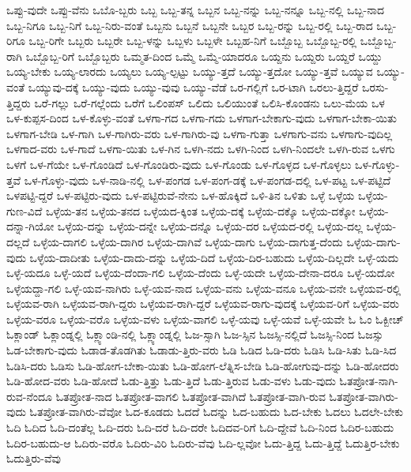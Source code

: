 {ಒಪ್ಪು-ವುದೇ
ಒಪ್ಪು-ವೆನು
ಒಬೊ-ಬ್ಬರು
ಒಬ್ಬ
ಒಬ್ಬ-ತನ್ನ
ಒಬ್ಬನ
ಒಬ್ಬ-ನನ್ನು
ಒಬ್ಬ-ನನ್ನೂ
ಒಬ್ಬ-ನಲ್ಲಿ
ಒಬ್ಬ-ನಾದ
ಒಬ್ಬ-ನಿಗೂ
ಒಬ್ಬ-ನಿಗೆ
ಒಬ್ಬ-ನಿರು-ವಂತೆ
ಒಬ್ಬನು
ಒಬ್ಬನೆ
ಒಬ್ಬನೇ
ಒಬ್ಬರ
ಒಬ್ಬ-ರನ್ನು
ಒಬ್ಬ-ರಲ್ಲಿ
ಒಬ್ಬ-ರಾದ
ಒಬ್ಬ-ರಿಗೂ
ಒಬ್ಬ-ರಿಗೇ
ಒಬ್ಬರು
ಒಬ್ಬರೇ
ಒಬ್ಬ-ಳನ್ನು
ಒಬ್ಬಳು
ಒಬ್ಬಳೇ
ಒಬ್ಬಹ-ನಿಗೆ
ಒಬ್ಬೊಬ್ಬ
ಒಬ್ಬೊಬ್ಬ-ರಲ್ಲಿ
ಒಬ್ಬೊಬ್ಬ-ರಾಗಿ
ಒಬ್ಬೊಬ್ಬ-ರಿಗೆ
ಒಬ್ಬೊಬ್ಬರು
ಒಮ್ಮತ-ದಿಂದ
ಒಮ್ಮೆ
ಒಮ್ಮೆ-ಯಾದರೂ
ಒಯ್ದನು
ಒಯ್ದರು
ಒಯ್ದರೆ
ಒಯ್ದು
ಒಯ್ಯ-ಬೇಕು
ಒಯ್ಯ-ಲಾರದು
ಒಯ್ಯಲು
ಒಯ್ಯ-ಲ್ಪಟ್ಟು
ಒಯ್ಯು-ತ್ತದೆ
ಒಯ್ಯು-ತ್ತದೋ
ಒಯ್ಯು-ತ್ತವೆ
ಒಯ್ಯುವ
ಒಯ್ಯು-ವಂತೆ
ಒಯ್ಯುವು-ದಕ್ಕೆ
ಒಯ್ಯು-ವುದು
ಒಯ್ಯು-ವುವು
ಒಯ್ಯು-ವೆಡೆ
ಒರ-ಗಲ್ಲಿಗೆ
ಒರ-ಟಾಗಿ
ಒರಲು-ತ್ತಿದ್ದರೆ
ಒರಸು-ತ್ತಿದ್ದರು
ಒರೆ-ಗಲ್ಲು
ಒರೆ-ಗಲ್ಲೆಂದು
ಒರೆಗೆ
ಒಲಿಂಪಸ್
ಒಲಿದು
ಒಲಿಯುಂತೆ
ಒಲಿಸಿ-ಕೊಂಡನು
ಒಲು-ಮೆಯ
ಒಳ
ಒಳ-ಕುಪ್ಪಸ-ದಿಂದ
ಒಳ-ಕೊಳ್ಳು-ವಂತೆ
ಒಳಗಾ-ಗದ
ಒಳಗಾ-ಗದು
ಒಳಗಾಗ-ಬೇಕಾಗು-ವುದು
ಒಳಗಾಗ-ಬೇಕಾ-ಯಿತು
ಒಳಗಾಗ-ಬೇಡಿ
ಒಳ-ಗಾಗಿ
ಒಳ-ಗಾಗಿರು-ವರು
ಒಳ-ಗಾಗಿರು-ವು
ಒಳಗಾ-ಗುತ್ತಾ
ಒಳಗಾಗು-ವನು
ಒಳಗಾಗು-ವುದಿಲ್ಲ
ಒಳಗಾದ-ವರು
ಒಳ-ಗಾದೆ
ಒಳಗಾ-ಯಿತು
ಒಳ-ಗಿನ
ಒಳಗಿ-ನದು
ಒಳಗಿ-ನಿಂದ
ಒಳಗಿ-ನಿಂದಲೇ
ಒಳಗಿ-ರುವ
ಒಳಗು
ಒಳಗೆ
ಒಳ-ಗೆಯೇ
ಒಳ-ಗೊಂಡಿದೆ
ಒಳ-ಗೊಂಡಿರು-ವುದು
ಒಳ-ಗೊಂಡು
ಒಳ-ಗೊಳ್ಳದ
ಒಳ-ಗೊಳ್ಳಲು
ಒಳ-ಗೊಳ್ಳು-ತ್ತವೆ
ಒಳ-ಗೊಳ್ಳು-ವುದು
ಒಳ-ನಾಡಿ-ನಲ್ಲಿ
ಒಳ-ಪಂಗಡ
ಒಳ-ಪಂಗ-ಡಕ್ಕೆ
ಒಳ-ಪಂಗಡ-ದಲ್ಲಿ
ಒಳ-ಪಟ್ಟ
ಒಳ-ಪಟ್ಟಿದೆ
ಒಳಪಟ್ಟಿ-ದ್ದರೆ
ಒಳ-ಪಟ್ಟಿರು-ವುದು
ಒಳ-ಪಟ್ಟಿರುವೆ-ನೇನು
ಒಳ-ಹೊಕ್ಕಿದೆ
ಒಳಿ-ತಿನ
ಒಳಿತು
ಒಳ್ಳೆ
ಒಳ್ಳೆಯ
ಒಳ್ಳೆಯ-ಗುಣ-ವಿದೆ
ಒಳ್ಳೆಯ-ತನ
ಒಳ್ಳೆಯ-ತನದ
ಒಳ್ಳೆಯದ-ಕ್ಕಿಂತ
ಒಳ್ಳೆಯ-ದಕ್ಕೆ
ಒಳ್ಳೆಯ-ದಕ್ಕೊ
ಒಳ್ಳೆಯ-ದಕ್ಕೋ
ಒಳ್ಳೆಯ-ದನ್ನಾ-ಗಿಯೋ
ಒಳ್ಳೆಯ-ದನ್ನು
ಒಳ್ಳೆಯ-ದನ್ನೇ
ಒಳ್ಳೆಯ-ದನ್ನೊ
ಒಳ್ಳೆಯ-ದರ
ಒಳ್ಳೆಯದ-ರಲ್ಲಿ
ಒಳ್ಳೆಯ-ದಲ್ಲ
ಒಳ್ಳೆಯ-ದಲ್ಲದೆ
ಒಳ್ಳೆಯ-ದಾಗಲಿ
ಒಳ್ಳೆಯ-ದಾಗಿರ
ಒಳ್ಳೆಯ-ದಾಗಿವೆ
ಒಳ್ಳೆಯ-ದಾಗು
ಒಳ್ಳೆಯ-ದಾಗುತ್ತ-ದೆಂದು
ಒಳ್ಳೆಯ-ದಾಗು-ವುದು
ಒಳ್ಳೆಯ-ದಾದೀತು
ಒಳ್ಳೆಯ-ದಾದು-ದನ್ನು
ಒಳ್ಳೆಯ-ದಿದೆ
ಒಳ್ಳೆಯ-ದಿರ-ಬಹುದು
ಒಳ್ಳೆಯ-ದಿಲ್ಲದೇ
ಒಳ್ಳೆ-ಯದು
ಒಳ್ಳೆ-ಯದೂ
ಒಳ್ಳೆ-ಯದೆ
ಒಳ್ಳೆಯ-ದೆಂದಾ-ಗಲಿ
ಒಳ್ಳೆಯ-ದೆಂದು
ಒಳ್ಳೆ-ಯದೇ
ಒಳ್ಳೆಯ-ದೇನಾ-ದರೂ
ಒಳ್ಳೆ-ಯದೋ
ಒಳ್ಳೆಯದ್ದಾ-ಗಲಿ
ಒಳ್ಳೆ-ಯವ-ನಾಗಿರು
ಒಳ್ಳೆ-ಯವ-ನಾದ
ಒಳ್ಳೆಯ-ವನು
ಒಳ್ಳೆಯ-ವನೂ
ಒಳ್ಳೆಯ-ವನೇ
ಒಳ್ಳೆಯವ-ರಲ್ಲಿ
ಒಳ್ಳೆಯವ-ರಾಗಿ
ಒಳ್ಳೆಯವ-ರಾಗಿ-ದ್ದರು
ಒಳ್ಳೆಯವ-ರಾಗಿ-ದ್ದರೆ
ಒಳ್ಳೆಯವ-ರಾಗು-ವುದಕ್ಕೆ
ಒಳ್ಳೆಯವ-ರಿಗೆ
ಒಳ್ಳೆಯ-ವರು
ಒಳ್ಳೆಯ-ವರೂ
ಒಳ್ಳೆಯ-ವರೊ
ಒಳ್ಳೆಯ-ವಳು
ಒಳ್ಳೆಯ-ವಾಗಲಿ
ಒಳ್ಳೆ-ಯವು
ಒಳ್ಳೆ-ಯವೆ
ಒಳ್ಳೆ-ಯವೇ
ಓ
ಓಂ
ಓಕ್ಬೀಚ್
ಓಕ್ಲಾಂಡ್
ಓಕ್ಲಾಂಡ್ನಲ್ಲಿ
ಓಕ್ಲ್ಯಾಂಡಿ-ನಲ್ಲಿ
ಓಕ್ಲ್ಯಾಂಡ್ನಲ್ಲಿ
ಓಜ-ಸ್ಸಾಗಿ
ಓಜ-ಸ್ಸಿನ
ಓಜಸ್ಸಿ-ನಲ್ಲಿದೆ
ಓಜಸ್ಸಿ-ನಿಂದ
ಓಜಸ್ಸು
ಓಡ-ಬೇಕಾಗು-ವುದು
ಓಡಾಡ-ತೊಡಗಿತು
ಓಡಾಡು-ತ್ತಿರು-ವರು
ಓಡಿ
ಓಡಿದ
ಓಡಿ-ದರು
ಓಡಿಸಿ
ಓಡಿ-ಸಿತು
ಓಡಿ-ಸಿದ
ಓಡಿಸಿ-ದರು
ಓಡಿಸು
ಓಡಿ-ಹೋಗ-ಬೇಕಾ-ಯಿತು
ಓಡಿ-ಹೋಗ-ಲೆತ್ನಿಸ-ಬೇಡಿ
ಓಡಿ-ಹೋಗುವು-ದನ್ನು
ಓಡಿ-ಹೋದರು
ಓಡಿ-ಹೋದ-ವರು
ಓಡಿ-ಹೋದೆ
ಓಡು-ತ್ತಿತ್ತು
ಓಡು-ತ್ತಿದೆ
ಓಡು-ತ್ತಿರುವ
ಓಡು-ವಳು
ಓಡು-ವುದು
ಓತಪ್ರೋತ-ನಾಗಿ-ರುವ-ನೆಂದೂ
ಓತಪ್ರೋತ-ನಾದ
ಓತಪ್ರೋತ-ವಾಗಲಿ
ಓತಪ್ರೋತ-ವಾಗಿದೆ
ಓತಪ್ರೋತ-ವಾಗಿ-ರುವ
ಓತಪ್ರೋತ-ವಾಗಿರು-ವುದು
ಓತಪ್ರೋತ-ವಾಗಿರು-ವೆವೋ
ಓದ-ಕೂಡದು
ಓದದೆ
ಓದನ್ನು
ಓದ-ಬಹುದು
ಓದ-ಬೇಕು
ಓದಲು
ಓದಲೇ-ಬೇಕು
ಓದಿ
ಓದಿದ
ಓದಿ-ದಂತೆಲ್ಲ
ಓದಿ-ದರು
ಓದಿ-ದರೆ
ಓದಿ-ದರೇ
ಓದಿದವ-ರಿಗೆ
ಓದಿ-ದ್ದೇವೆ
ಓದಿ-ನಿಂದ
ಓದಿರ-ಬಹುದು
ಓದಿರ-ಬಹುದು-ಆ
ಓದಿರು-ವರೊ
ಓದಿರು-ವಿರಿ
ಓದಿರು-ವೆವು
ಓದಿ-ಲ್ಲವೋ
ಓದು-ತ್ತಿದ್ದ
ಓದು-ತ್ತಿದ್ದೆ
ಓದುತ್ತಿರ-ಬೇಕು
ಓದುತ್ತಿರು-ವೆವು
}
